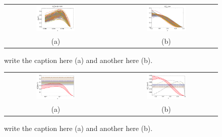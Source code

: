 \documentclass[aps,preprintnumbers,showpacs,nofootinbib,superscriptaddress,floatfix]{revtex4}
\begin{document}
\begin{figure}[h!]
\centering
\begin{tabular}{ccc}
\includegraphics[width=0.40\textwidth]{plots/kT2av_curves_at1GeV_flINDEP.pdf}
&\hspace{0.001cm}
&
\includegraphics[width=0.40\textwidth]{plots/PT2av_curves_at1GeV_flINDEP.pdf}
\\
(a) && (b)
\end{tabular}
\caption{write the caption here (a) and another here (b).}
\label{f:avmomenta_all_rep}
\end{figure}
\begin{figure}[h!]
\centering
\begin{tabular}{ccc}
\includegraphics[width=0.40\textwidth]{plots/kT2av_Compare_with_other_extractions_flINDEP.pdf}
&\hspace{0.001cm}
&
\includegraphics[width=0.40\textwidth]{plots/PT2av_Compare_with_other_extractions_flINDEP.pdf}
\\
(a) && (b)
\end{tabular}
\caption{write the caption here (a) and another here (b).}
\label{f:avmomenta_68CL}
\end{figure}
\end{document}
